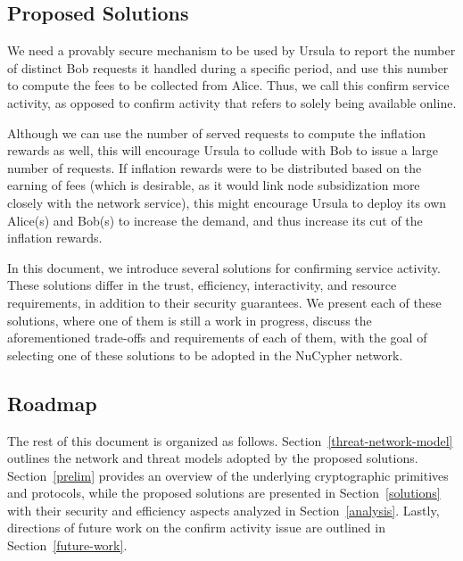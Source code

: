 \subsection{Proposed Solutions}
We need a provably secure mechanism to be used by Ursula to report the 
number of distinct Bob requests it handled during a specific period, and use this number 
to compute the fees to be collected from Alice. Thus, we call this confirm 
service activity, as opposed to confirm activity that refers to solely being available 
online.


Although we can use the number of served requests to compute the inflation 
rewards as well, this will encourage Ursula to collude with Bob to issue a large
number of requests. If inflation rewards were to be distributed based on the earning of fees (which is desirable, as it would link node subsidization more closely with the network service), this might encourage Ursula to deploy its own Alice(s) 
and Bob(s) to increase the demand, and thus increase its cut of the inflation rewards.


In this document, we introduce several solutions for confirming service activity. 
These solutions differ in the trust, efficiency, interactivity, and resource 
requirements, in addition to their security guarantees. We present each of these 
solutions, where one of them is still a work in progress, discuss the aforementioned
trade-offs and requirements of each of them, with the goal of selecting one of these 
solutions to be adopted in the NuCypher network.


\subsection{Roadmap}
The rest of this document is organized as follows. Section~\ref{threat-network-model} 
outlines the network and threat models adopted by the proposed solutions. 
Section~\ref{prelim} provides an overview of the underlying cryptographic primitives and 
protocols, while the proposed solutions are presented 
in Section~\ref{solutions} with their security and efficiency aspects analyzed in 
Section~\ref{analysis}. Lastly, directions of future work on the confirm activity issue 
are outlined in Section~\ref{future-work}.


